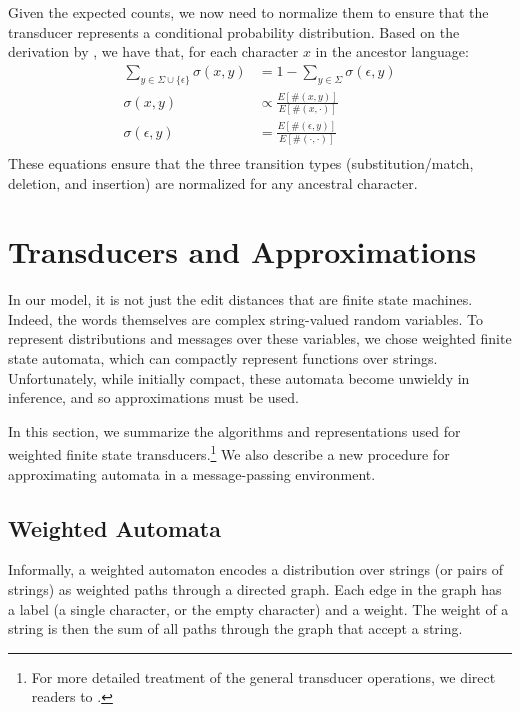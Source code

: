 \documentclass[11pt,a4paper]{article}
\begin{document}
Given the expected counts, we now need to normalize them to ensure
that the transducer represents a conditional probability distribution.
Based on the derivation by , we have that,
for each character $x$ in the ancestor language:
\begin{equation}
  \begin{split}
    \sum_{y \in \Sigma \cup \{\epsilon\}} \sigma(x,y) &= 1 - \sum_{y \in \Sigma} \sigma(\epsilon,y) \\
    \sigma(x,y) &\propto \frac{E[\#(x,y)]}{E[\#(x,\cdot)]} \\
    \sigma(\epsilon,y) &= \frac{E[\#(\epsilon,y)]}{E[\#(\cdot,\cdot)]} \\
   \end{split}
 \end{equation}
These equations ensure that the three transition types (substitution/match,
deletion, and insertion) are normalized for any ancestral character.

\section{Transducers and Approximations}

In our model, it is not just the edit distances that are finite
state machines. Indeed, the words themselves are complex string-valued
random variables. To represent distributions and messages over these
variables, we chose weighted finite state automata, which can
compactly represent functions over strings. Unfortunately, while
initially compact, these automata become unwieldy in inference,
and so approximations must be used.

In this section, we summarize the algorithms and representations
used for weighted finite state transducers.\footnote{For more
detailed treatment of the general transducer operations, we direct
readers to .} We also describe a new
procedure for approximating automata in a message-passing environment.

\subsection{Weighted Automata}

Informally, a weighted automaton encodes a distribution over strings
(or pairs of strings) as weighted paths through a directed graph.
Each edge in the graph has a label (a single character, or the empty
character) and a weight. The weight of a string is then the sum
of all paths through the graph that accept a string.
\end{document}
